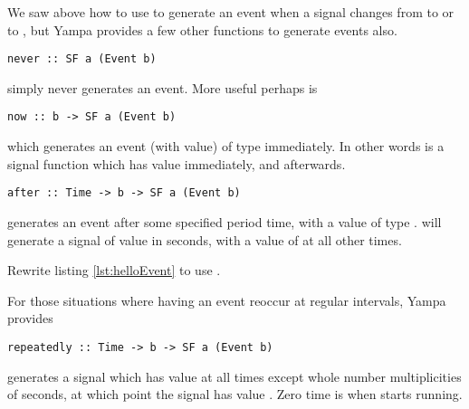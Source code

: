 We saw above how to use  to generate an event when a signal changes from  to  or  to , but Yampa provides a few other functions to generate events also.

\begin{lstlisting}
never :: SF a (Event b)
\end{lstlisting}

\noindent simply never generates an event. More useful perhaps is

\begin{lstlisting}
now :: b -> SF a (Event b)
\end{lstlisting}

\noindent which generates an event (with value) of type  immediately. In other words  is a signal function which has value  immediately, and  afterwards.

\begin{lstlisting}
after :: Time -> b -> SF a (Event b)
\end{lstlisting}

\noindent generates an event after some specified period time, with a value of type .  will generate a signal of value  in  seconds, with a value of  at all other times.

\begin{exercise}
Rewrite listing \ref{lst:helloEvent} to use .
\end{exercise}

\noindent For those situations where having an event reoccur at regular intervals, Yampa provides

\begin{lstlisting}
repeatedly :: Time -> b -> SF a (Event b)
\end{lstlisting}

\noindent {} generates a signal which has value  at all times except whole number multiplicities of  seconds, at which point the signal has value . Zero time is when  starts running.
